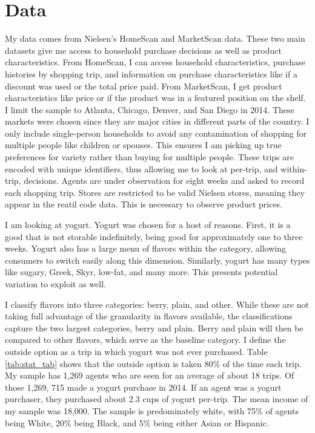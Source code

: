 \documentclass[11pt]{article}
\theoremstyle{definition}
\theoremstyle{remark}
\begin{document}
\section{Data}

    My data comes from Nielsen's HomeScan and MarketScan data. These two main datasets give me access to household purchase decisions as well as product characteristics. From HomeScan, I can access household characteristics, purchase histories by shopping trip, and information on purchase characteristics like if a discount was used or the total price paid. From MarketScan, I get product characteristics like price or if the product was in a featured position on the shelf. I limit the sample to Atlanta, Chicago, Denver, and San Diego in 2014. These markets were chosen since they are major cities in different parts of the country. I only include single-person households to avoid any contamination of shopping for multiple people like children or spouses. This ensures I am picking up true preferences for variety rather than buying for multiple people. These trips are encoded with unique identifiers, thus allowing me to look at per-trip, and within-trip, decisions. Agents are under observation for eight weeks and asked to record each shopping trip. Stores are restricted to be valid Nielsen stores, meaning they appear in the reatil code data. This is necessary to observe product prices.
    
    I am looking at yogurt. Yogurt was chosen for a host of reasons. First, it is a good that is not storable indefinitely, being good for approximately one to three weeks. Yogurt also has a large menu of flavors within the category, allowing consumers to switch easily along this dimension. Similarly, yogurt has many types like sugary, Greek, Skyr, low-fat, and many more. This presents potential variation to exploit as well.

    I classify flavors into three categories: berry, plain, and other. While these are not taking full advantage of the granularity in flavors available, the classifications capture the two largest categories, berry and plain. Berry and plain will then be compared to other flavors, which serve as the baseline category. I define the outside option as a trip in which yogurt was not ever purchased. Table \ref{tab:stat_tab} shows that the outside option is taken 80\% of the time each trip. My sample has 1,269 agents who are seen for an average of about 18 trips. Of those 1,269, 715 made a yogurt purchase in 2014. If an agent was a yogurt purchaser, they purchased about 2.3 cups of yogurt per-trip. The mean income of my sample was 18,000. The sample is predominately white, with 75\% of agents being White, 20\% being Black, and 5\% being either Asian or Hispanic. 
\end{document}
